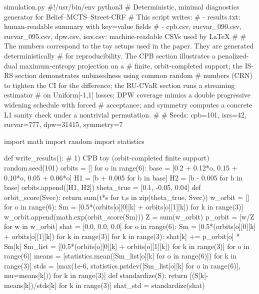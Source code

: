 \begin{filecontents*}{simulation.py}
#!/usr/bin/env python3
# Deterministic, minimal diagnostics generator for Belief--MCTS--Street-CRF
# This script writes:
#  - results.txt: human-readable summary with key=value fields
#  - cpb.csv, rucvar_090.csv, rucvar_095.csv, dpw.csv, isrs.csv: machine-readable CSVs used by LaTeX
#
# The numbers correspond to the toy setups used in the paper. They are generated deterministically
# for reproducibility. The CPB section illustrates a penalized-dual maximum-entropy projection on a
# finite, orbit-completed support; the IS-RS section demonstrates unbiasedness using common random
# numbers (CRN) to tighten the CI for the difference; the RU-CVaR section runs a streaming estimator
# on Uniform[-1,1] losses; DPW coverage mimics a double progressive widening schedule with forced
# acceptance; and symmetry computes a concrete L1 sanity check under a nontrivial permutation.
#
# Seeds: cpb=101, isrs=42, rucvar=777, dpw=31415, symmetry=7

import math
import random
import statistics

def write_results():
    # 1) CPB toy (orbit-completed finite support)
    random.seed(101)
    orbits = []
    for o in range(6):
        base = [0.2 + 0.12*o, 0.15 + 0.10*o, 0.05 + 0.06*o]
        H1 = [b + 0.005 for b in base]
        H2 = [b - 0.005 for b in base]
        orbits.append([H1, H2])
    theta_true = [0.1, -0.05, 0.04]
    def orbit_score(Svec):
        return sum(t*s for t,s in zip(theta_true, Svec))
    w_orbit = []
    for o in range(6):
        Sm = [0.5*(orbits[o][0][k] + orbits[o][1][k]) for k in range(3)]
        w_orbit.append(math.exp(orbit_score(Sm)))
    Z = sum(w_orbit)
    p_orbit = [w/Z for w in w_orbit]
    shat = [0.0, 0.0, 0.0]
    for o in range(6):
        Sm = [0.5*(orbits[o][0][k] + orbits[o][1][k]) for k in range(3)]
        for k in range(3):
            shat[k] += p_orbit[o] * Sm[k]
    Sm_list = [[0.5*(orbits[o][0][k] + orbits[o][1][k]) for k in range(3)] for o in range(6)]
    means = [statistics.mean([Sm_list[o][k] for o in range(6)]) for k in range(3)]
    stds = [max(1e-6, statistics.pstdev([Sm_list[o][k] for o in range(6)], mu=means[k])) for k in range(3)]
    def standardize(S):
        return [(S[k]-means[k])/stds[k] for k in range(3)]
    shat_std = standardize(shat)


\end{filecontents*}
